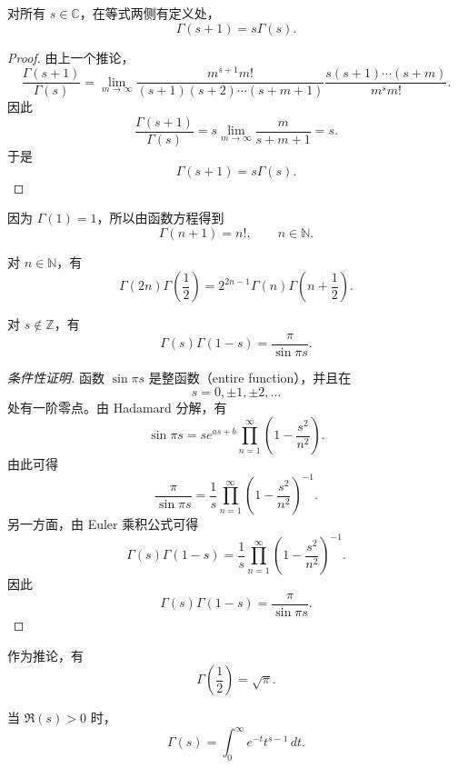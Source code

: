 \begin{theorem}
	对所有 $s\in\mathbb C$，在等式两侧有定义处，
	\[
		\Gamma(s+1)=s\Gamma(s).
	\]
\end{theorem}

\begin{proof}
	由上一个推论，
	\[
		\frac{\Gamma(s+1)}{\Gamma(s)}
		=
		\lim_{m\to\infty}
		\frac{m^{s+1}m!}{(s+1)(s+2)\cdots(s+m+1)}
		\frac{s(s+1)\cdots(s+m)}{m^s m!}.
	\]
	因此
	\[
		\frac{\Gamma(s+1)}{\Gamma(s)}
		=
		s\lim_{m\to\infty}\frac{m}{s+m+1}
		=
		s.
	\]
	于是
	\[
		\Gamma(s+1)=s\Gamma(s).
	\]
\end{proof}

因为 $\Gamma(1)=1$，所以由函数方程得到
\[
	\Gamma(n+1)=n!,\qquad n\in\mathbb N.
\]

\begin{corollary}
	对 $n\in\mathbb N$，有
	\[
		\Gamma(2n)\Gamma\left(\frac12\right)
		=
		2^{2n-1}\Gamma(n)\Gamma\left(n+\frac12\right).
	\]
\end{corollary}

\begin{theorem}
	对 $s\notin\mathbb Z$，有
	\[
		\Gamma(s)\Gamma(1-s)
		=
		\frac{\pi}{\sin \pi s}.
	\]
\end{theorem}

\begin{proof}[条件性证明]
	函数 $\sin \pi s$ 是整函数（entire function），并且在
	\[
		s=0,\pm1,\pm2,\ldots
	\]
	处有一阶零点。由 Hadamard 分解，有
	\[
		\sin\pi s
		=
		s e^{as+b}
		\prod_{n=1}^{\infty}
		\left(1-\frac{s^2}{n^2}\right).
	\]
	由此可得
	\[
		\frac{\pi}{\sin \pi s}
		=
		\frac{1}{s}
		\prod_{n=1}^{\infty}
		\left(1-\frac{s^2}{n^2}\right)^{-1}.
	\]
	另一方面，由 Euler 乘积公式可得
	\[
		\Gamma(s)\Gamma(1-s)
		=
		\frac{1}{s}
		\prod_{n=1}^{\infty}
		\left(1-\frac{s^2}{n^2}\right)^{-1}.
	\]
	因此
	\[
		\Gamma(s)\Gamma(1-s)=\frac{\pi}{\sin\pi s}.
	\]
\end{proof}

作为推论，有
\[
	\Gamma\left(\frac12\right)=\sqrt{\pi}.
\]

\begin{theorem}
	当 $\Re(s)>0$ 时，
	\[
		\Gamma(s)=\int_0^\infty e^{-t}t^{s-1}\,dt.
	\]
\end{theorem}

